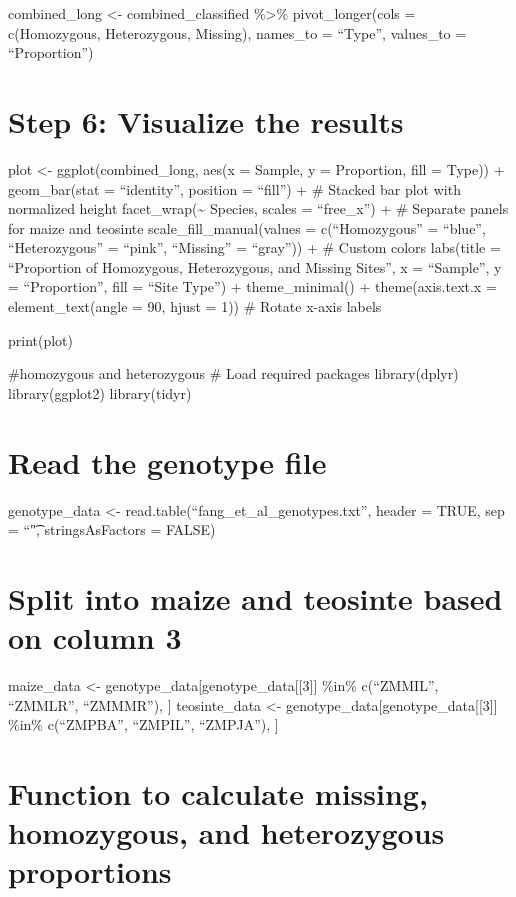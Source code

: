 \documentclass[
]{article}
\begin{document}
combined\_long \textless- combined\_classified \%\textgreater\%
pivot\_longer(cols = c(Homozygous, Heterozygous, Missing), names\_to =
``Type'', values\_to = ``Proportion'')

\section{Step 6: Visualize the
results}\label{step-6-visualize-the-results}

plot \textless- ggplot(combined\_long, aes(x = Sample, y = Proportion,
fill = Type)) + geom\_bar(stat = ``identity'', position = ``fill'') + \#
Stacked bar plot with normalized height facet\_wrap(\textasciitilde{}
Species, scales = ``free\_x'') + \# Separate panels for maize and
teosinte scale\_fill\_manual(values = c(``Homozygous'' = ``blue'',
``Heterozygous'' = ``pink'', ``Missing'' = ``gray'')) + \# Custom colors
labs(title = ``Proportion of Homozygous, Heterozygous, and Missing
Sites'', x = ``Sample'', y = ``Proportion'', fill = ``Site Type'') +
theme\_minimal() + theme(axis.text.x = element\_text(angle = 90, hjust =
1)) \# Rotate x-axis labels

print(plot)

\#homozygous and heterozygous \# Load required packages library(dplyr)
library(ggplot2) library(tidyr)

\section{Read the genotype file}\label{read-the-genotype-file}

genotype\_data \textless- read.table(``fang\_et\_al\_genotypes.txt'',
header = TRUE, sep = ``\t", stringsAsFactors = FALSE)

\section{Split into maize and teosinte based on column
3}\label{split-into-maize-and-teosinte-based-on-column-3}

maize\_data \textless- genotype\_data{[}genotype\_data{[}{[}3{]}{]}
\%in\% c(``ZMMIL'', ``ZMMLR'', ``ZMMMR''), {]} teosinte\_data \textless-
genotype\_data{[}genotype\_data{[}{[}3{]}{]} \%in\% c(``ZMPBA'',
``ZMPIL'', ``ZMPJA''), {]}

\section{Function to calculate missing, homozygous, and heterozygous
proportions}\label{function-to-calculate-missing-homozygous-and-heterozygous-proportions}
\end{document}
